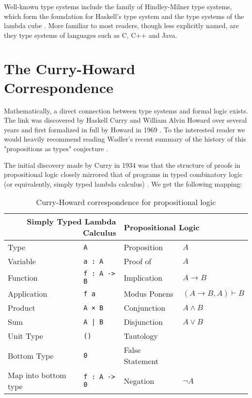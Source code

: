 Well-known type systems include the family of Hindley-Milner type systems, which form the foundation for Haskell's type system \cite{haskelldesignreport} and the type systems of the lambda cube \cite{barendregt:1991:lambdacube}. More familiar to most readers, though less explicitly named, are they type systems of languages such as C, C++ and Java.

\section{The Curry-Howard Correspondence}
Mathematically, a direct connection between type systems and formal logic exists. The link was discovered by Haskell Curry and William Alvin Howard over several years and first formalized in full by Howard in 1969 \cite{howard1969formulaeastypes}. To the interested reader we would heavily recommend reading Wadler's recent summary of the history of this "propositions as types" conjecture \cite{wadler:2015:propositions}.

The initial discovery made by Curry in 1934 was that the structure of proofs in propositional logic closely mirrored that of programs in typed combinatory logic (or equivalently, simply typed lambda calculus) \cite{curry1934functionality}. We get the following mapping:

\begin{table}[H]
    \begin{center}
    \begin{tabular}{ll|ll}
                    \multicolumn{2}{r|}{\textbf{Simply Typed Lambda Calculus}}  & \multicolumn{2}{l}{\textbf{Propositional Logic}} \\ \hline
        Type        & \texttt{A}            & Proposition   & $A$ \\
        Variable    & \texttt{a : A}        & Proof of      & $A$ \\
        Function    & \texttt{f : A -> B}   & Implication   & $A \to B$ \\
        Application & \texttt{f a}          & Modus Ponens  & $(A \to B, A) \vdash B$ \\
        Product     & \texttt{A × B}        & Conjunction   & $A \land B$ \\
        Sum         & \texttt{A | B}        & Disjunction   & $A \lor B$ \\
        Unit Type   & \texttt{()}           & Tautology     & \\
        Bottom Type & \texttt{0}            & False Statement & \\
        Map into bottom type & \texttt{f : A -> 0}   & Negation       & $\lnot A$
    \end{tabular}
    \end{center}
\caption{Curry-Howard correspondence for propositional logic}
\label{tab:curryhowardprop}
\end{table}

